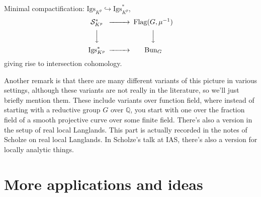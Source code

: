 \documentclass[reqno]{amsart} 
\begin{document}
\begin{remark}
  Minimal compactification: $\mathrm{Igs}_{K^p} \hookrightarrow \mathrm{Igs}_{K^p}^\ast$,
  \begin{equation*}
    \begin{CD}         
      \mathcal{S}_{K^p}^\ast @>>> \operatorname{Flag}(G, \mu^{-1})\\
      @VVV  @VVV \\
      \mathrm{Igs}_{K^p}^\ast @>>> \mathrm{Bun}_G\\
    \end{CD}
  \end{equation*}
  giving rise to intersection cohomology.
\end{remark}
\begin{remark}
  Another remark is that there are many different variants of this picture in various settings, although these variants are not really in the literature, so we'll just briefly mention them.  These include variants over function field, where instead of starting with a reductive group $G$ over $\mathbb{Q}$, you start with one over the fraction field of a smooth projective curve over some finite field.  There's also a version in the setup of real local Langlands.  This part is actually recorded in the notes of Scholze on real local Langlands.  In Scholze's talk at IAS, there's also a version for locally analytic things.
\end{remark}

\section{More applications and ideas}
\end{document}
